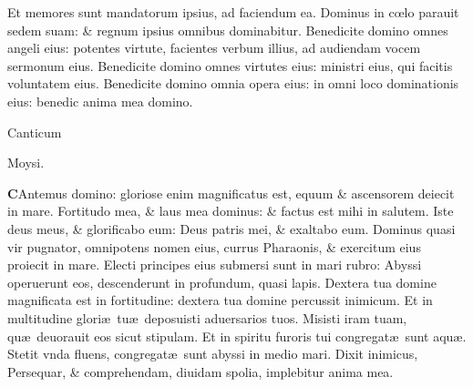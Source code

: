 \documentclass[a5paper,10pt]{book}
\def\ae{æ}
\def\oe{œ}
\begin{document}
\begin{multicols*}{2}
\newline \color{red} E\color{black}t memores sunt mandatorum ipsius, ad faciendum ea.
\newline \color{red} D\color{black}ominus in c\oe lo parauit sedem suam: \& regnum ipsius omnibus dominabitur.
\newline \color{red} B\color{black}enedicite domino omnes angeli eius: potentes virtute, facientes verbum illius, ad audiendam vocem sermonum eius.
\newline \color{red} B\color{black}enedicite domino omnes virtutes eius: ministri eius, qui facitis voluntatem eius.
\newline \color{red} B\color{black}enedicite domino omnia opera eius: in omni loco dominationis eius: benedic anima mea domino.
\vspace{-1em}
\begin{center} \color{red}
\hypertarget{Exodus}{Canticum} Moysi.
\end{center}
\vspace{-1em}
\lettrine[lines=2]{\bfseries \color{red} C}{}Antemus domino: gloriose enim magnificatus est, equum \& ascensorem deiecit in mare.
\newline \color{red} F\color{black}ortitudo mea, \& laus mea dominus: \& factus est mihi in salutem.
\newline \color{red} I\color{black}ste deus meus, \& glorificabo eum: Deus patris mei, \& exaltabo eum.
\newline \color{red} D\color{black}ominus quasi vir pugnator, omnipotens nomen eius, currus Pharaonis, \& exercitum eius proiecit in mare.
\newline \color{red} E\color{black}lecti principes eius submersi sunt in mari rubro: Abyssi operuerunt eos, descenderunt in profundum, quasi lapis.
\newline \color{red} D\color{black}extera tua domine magnificata est in fortitudine: dextera tua domine percussit inimicum.
\newline \color{red} E\color{black}t in multitudine glori\ae \ tu\ae \ deposuisti aduersarios tuos.
\newline \color{red} M\color{black}isisti iram tuam, qu\ae \ deuorauit eos sicut stipulam. Et in spiritu furoris tui congregat\ae \ sunt aqu\ae .
\newline \color{red} S\color{black}tetit vnda fluens, congregat\ae \ sunt abyssi in medio mari.
\newline \color{red} D\color{black}ixit inimicus, Persequar, \& comprehendam, diuidam spolia, implebitur anima mea.

\end{multicols*}
\end{document}
